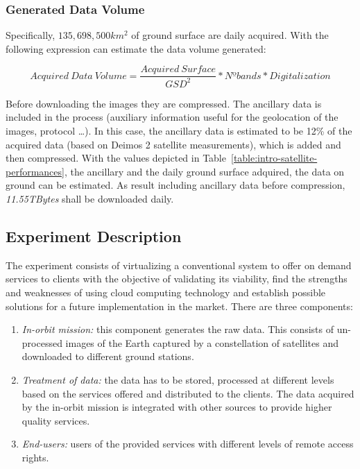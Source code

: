 \subsubsection{Generated Data Volume}

Specifically, $135,698,500 km^2$ of ground surface are daily acquired. With the following expression can estimate the data volume generated:

\begin{equation}
Acquired~Data~Volume= \frac{Acquired~Surface}{GSD^2} * Nº bands * Digitalization
\end{equation}

Before downloading the images they are compressed. The ancillary data is
included in the process (auxiliary information useful for the geolocation of the
images, protocol \ldots). In this case, the ancillary data is estimated to be
12\% of the acquired data (based on Deimos 2 satellite measurements), which is
added and then compressed. With the values depicted in
Table~\ref{table:intro-satellite-performances}, the ancillary and the daily ground
surface adquired, the data on ground can be estimated. As result including ancillary data before compression, \emph{11.55TBytes} shall be downloaded daily.


\subsection{Experiment Description}

The experiment consists of virtualizing a conventional \EO system to offer on
demand services to clients with the objective of validating its viability, find
the strengths and weaknesses of using cloud computing technology and establish
possible solutions for a future implementation in the market. There are three
components:
\begin{enumerate}
\item \emph{In-orbit mission:} this component generates the raw data. This consists of un-processed images of the Earth captured by a constellation of satellites and downloaded to different ground stations.
\item \emph{Treatment of data:} the data has to be stored, processed at different levels based on the services offered and distributed to the clients. The data acquired by the in-orbit mission is integrated with other sources to provide higher quality services.
\item \emph{End-users:} users of the provided services with different levels of remote access rights.

\end{enumerate}


